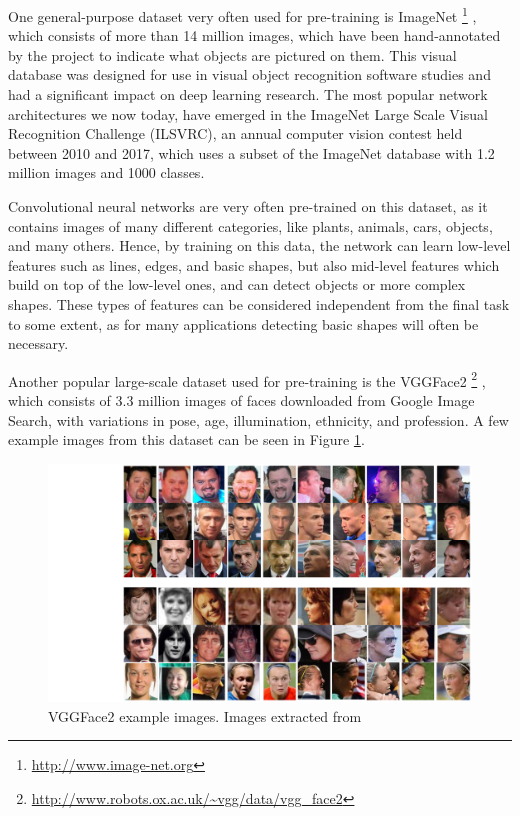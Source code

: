 One general-purpose dataset very often used for pre-training is ImageNet \footnote{\url{http://www.image-net.org}} \citep{DengDSLL009}, which consists of more than 14 million images, which have been hand-annotated by the project to indicate what objects are pictured on them. This visual database was designed for use in visual object recognition software studies and had a significant impact on deep learning research. The most popular network architectures we now today, have emerged in the ImageNet Large Scale Visual Recognition Challenge (ILSVRC), an annual computer vision contest held between 2010 and 2017, which uses a subset of the ImageNet database with 1.2 million images and 1000 classes. 

Convolutional neural networks are very often pre-trained on this dataset, as it contains images of many different categories, like plants, animals, cars, objects, and many others. Hence, by training on this data, the network can learn low-level features such as lines, edges, and basic shapes, but also mid-level features which build on top of the low-level ones, and can detect objects or more complex shapes. These types of features can be considered independent from the final task to some extent, as for many applications detecting basic shapes will often be necessary.

Another popular large-scale dataset used for pre-training is the VGGFace2 \footnote{\url{http://www.robots.ox.ac.uk/~vgg/data/vgg_face2}} \citep{Cao2018}, which consists of 3.3 million images of faces downloaded from Google Image Search, with variations in pose, age, illumination, ethnicity, and profession. A few example images from this dataset can be seen in Figure \ref{fig:vggface}.

\begin{figure}[h!tp]
    \centering
\hspace{-1in}
    \includegraphics[width=.95\textwidth]{imgs/chap5_vggface2.png}
    \caption[VGGFace2 example images.]{VGGFace2 example images. Images extracted from \cite{Cao2018}}
    \label{fig:vggface}
\end{figure}

